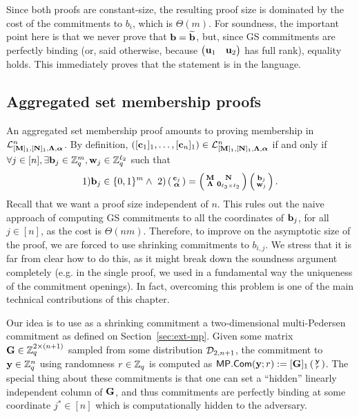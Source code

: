 Since both proofs are constant-size, the resulting proof size is dominated by the cost of the commitments to $b_i$, which is $\Theta(m)$. 
For soundness, the important point here is that we never prove that $\mathbf{b}=\widetilde{\mathbf{b}}$, but, since GS commitments are perfectly binding (or, said otherwise, because $\begin{pmatrix} \mathbf{u}_1 &   \mathbf{u}_2 \end{pmatrix}$
has full rank), equality holds. This immediately proves that the statement is in the language.  
\subsection{Aggregated set membership proofs}
An aggregated set membership proof amounts to proving membership in $\mathcal{L}_{[\mathbf{{M}}]_1,[\mathbf{{N}}]_1,\mathbf{{\Lambda}},{\boldsymbol \alpha}}^n$. By definition, $([\mathbf{c}_1]_1,\ldots, [\mathbf{c}_n]_1) \in\mathcal{L}_{[\mathbf{{M}}]_1,[\mathbf{{N}}]_1,\mathbf{{\Lambda}},{\boldsymbol \alpha}}^n$ if and only if  $\forall j \in [n], \exists \mathbf{b}_j\in \mathbb{Z}_q^{m},\mathbf{w}_j\in\mathbb{Z}_q^{\ell_2}$ such that
$$
 1) \mathbf{b}_j\in \{0,1\}^{m}
  \wedge \ 2)
\left(\begin{smallmatrix}
    \mathbf{c}_j\\
    {\boldsymbol \alpha}
\end{smallmatrix}\right)
=
\left(\begin{smallmatrix}
    \mathbf{{M}}       & \mathbf{{N}}\\
    \mathbf{{\Lambda}} & \mathbf{{0}}_{{\ell_3}\times {\ell_2}}
\end{smallmatrix}\right)
\left(\begin{smallmatrix}
    \mathbf{b}_j\\
    \mathbf{w}_j
\end{smallmatrix}\right).
$$
Recall that we want a proof size independent of $n$. This rules out the naive approach of computing GS commitments to all the coordinates of $\mathbf{b}_j$, for all $j \in [n]$, as the cost is $\Theta(nm)$. Therefore, to improve on the asymptotic size of the proof, we are forced to use shrinking commitments to $b_{i,j}$. We stress that it is far from clear how to do this, as it might break down the soundness argument completely (e.g. in the single proof, we used in a fundamental way the uniqueness of the commitment openings). In fact, overcoming this problem is one of the main technical contributions of this chapter. 

Our idea is to use as a shrinking commitment a two-dimensional multi-Pedersen commitment as defined on Section~\ref{sec:ext-mp}. Given some matrix $\mathbf{{G}} \in \mathbb{Z}_q^{2 \times (n+1)}$ sampled from some distribution $\mathcal{D}_{2,n+1}$, the commitment to $\mathbf{y}\in\mathbb{Z}_q^n$ using randomness $r\in\mathbb{Z}_q$ is computed as $\mathsf{MP}.\mathsf{Com}(\mathbf{y};r):=[\mathbf{{G}}]_1 \left(\begin{smallmatrix}\mathbf{y} \\ r\end{smallmatrix}\right)$. The special thing about these commitments is that one can set a ``hidden'' linearly independent column of 
$\mathbf{{G}}$, and thus commitments are perfectly binding at some coordinate $j^*\in[n]$ which is computationally hidden to the adversary.

